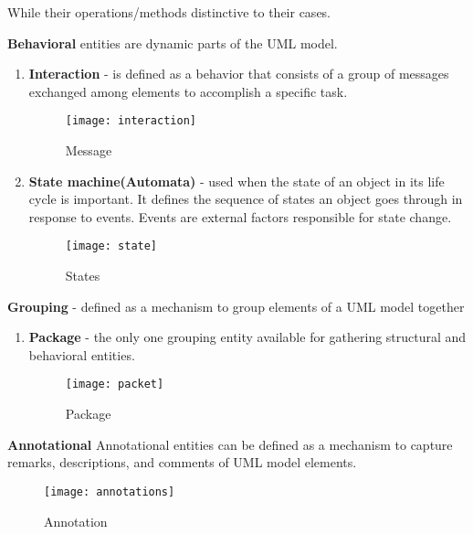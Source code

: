 While their operations/methods distinctive to their cases.
\newpage
\par
\noindent
\textbf{Behavioral} entities are dynamic parts of the UML model.
\begin{enumerate}
\item \textbf{Interaction} - is defined as a behavior that consists of a group of messages exchanged among elements to accomplish a specific task.
\begin{figure}[h!]
\centering
\texttt{[image: interaction]}
\caption{Message}
\end{figure}
\item \textbf{State machine(Automata)} - used when the state of an object in its life cycle is important. It defines the sequence of states an object goes through in response to events. Events are external factors responsible for state change.
\begin{figure}[h!]
\centering
\texttt{[image: state]}
\caption{States}
\end{figure}
\end{enumerate}
\par
\noindent
\textbf{Grouping} - defined as a mechanism to group elements of a UML model together
\begin{enumerate}
\item \textbf{Package} - the only one grouping entity available for gathering structural and behavioral entities.
\begin{figure}[h!]
\centering
\texttt{[image: packet]}
\caption{Package} 
\end{figure}
\end{enumerate}
\par
\noindent
\textbf{Annotational} Annotational entities can be defined as a mechanism to capture remarks, descriptions, and comments of UML model elements.
\begin{figure}[h!]
\centering
\texttt{[image: annotations]}
\caption{Annotation} 
\end{figure}
\newpage

